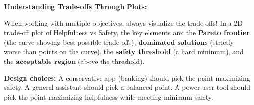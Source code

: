 \begin{chapterenv}
\begin{tipbox}
\textbf{Understanding Trade-offs Through Plots:}

When working with multiple objectives, always visualize the trade-offs! In a 2D trade-off plot of Helpfulness vs Safety, the key elements are: the \textbf{Pareto frontier} (the curve showing best possible trade-offs), \textbf{dominated solutions} (strictly worse than points on the curve), the \textbf{safety threshold} (a hard minimum), and the \textbf{acceptable region} (above the threshold).

\textbf{Design choices:} A conservative app (banking) should pick the point maximizing safety. A general assistant should pick a balanced point. A power user tool should pick the point maximizing helpfulness while meeting minimum safety.
\end{tipbox}

\end{chapterenv}